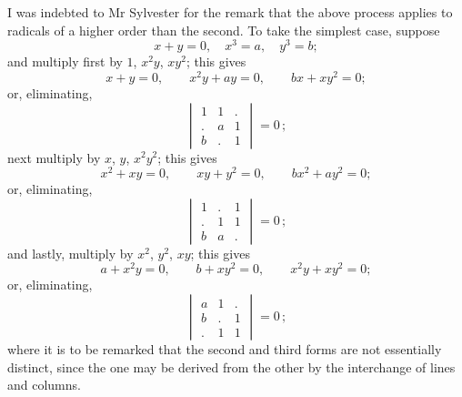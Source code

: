 \documentclass[11pt,a4paper]{article}
\theoremstyle{plain}
\begin{document}
I was indebted to Mr Sylvester for the remark that the above process applies to radicals of a higher order than the second. To take the simplest case, suppose
\[x + y = 0, \quad x^3 = a, \quad y^3 = b;\]
and multiply first by $1$, $x^2 y$, $xy^2$; this gives
\[x + y = 0, \qquad x^2 y + ay = 0, \qquad bx + x y^2 = 0;\]
or, eliminating,
\[\begin{vmatrix} 1 & 1 & . \\ . & a & 1 \\ b & . & 1 \end{vmatrix} = 0\,;\]
next multiply by $x$, $y$, $x^2 y^2$; this gives
\[x^2 + xy = 0, \qquad xy + y^2 = 0, \qquad b x^2 + a y^2 = 0;\]
or, eliminating,
\[\begin{vmatrix} 1 & . & 1 \\ . & 1 & 1 \\ b & a & . \end{vmatrix} = 0\,;\]
and lastly, multiply by $x^2$, $y^2$, $xy$; this gives
\[a + x^2 y = 0, \qquad b + x y^2 = 0, \qquad x^2 y + x y^2 = 0;\]
or, eliminating,
\[\begin{vmatrix} a & 1 & . \\ b & . & 1 \\ . & 1 & 1 \end{vmatrix} = 0\,;\]
where it is to be remarked that the second and third forms are not essentially distinct, since the one may be derived from the other by the interchange of lines and columns.
\end{document}
